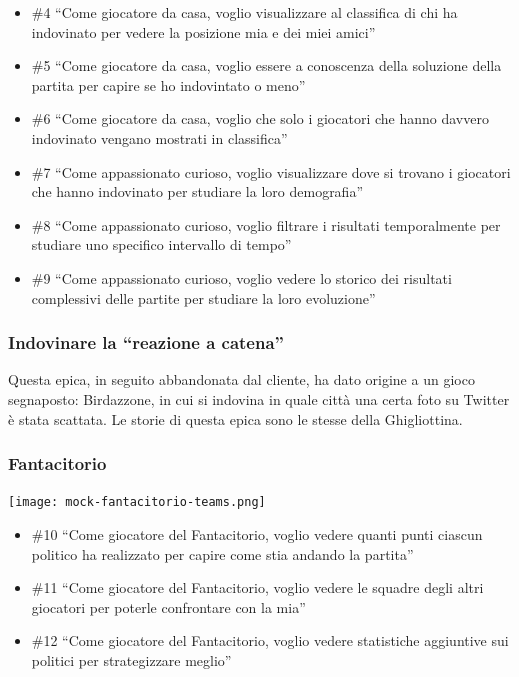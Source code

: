 \documentclass{article}
\begin{document}
\begin{itemize}
	\item \#4 ``Come giocatore da casa, voglio visualizzare al classifica di chi ha
	      indovinato per vedere la posizione mia e dei miei amici''
	\item \#5 ``Come giocatore da casa, voglio essere a conoscenza della soluzione
	      della partita per capire se ho indovintato o meno''
	\item \#6 ``Come giocatore da casa, voglio che solo i giocatori che hanno davvero
	      indovinato vengano mostrati in classifica''
	\item \#7 ``Come appassionato curioso, voglio visualizzare dove si trovano i
	      giocatori che hanno indovinato per studiare la loro demografia''
	\item \#8 ``Come appassionato curioso, voglio filtrare i risultati temporalmente
	      per studiare uno specifico intervallo di tempo''
	\item \#9 ``Come appassionato curioso, voglio vedere lo storico dei risultati
	      complessivi delle partite per studiare la loro evoluzione''
\end{itemize}

\subsubsection{Indovinare la ``reazione a catena''}

Questa epica, in seguito abbandonata dal cliente, ha dato origine a un gioco
segnaposto: Birdazzone, in cui si indovina in quale città una certa foto su
Twitter è stata scattata. Le storie di questa epica sono le stesse della
Ghigliottina.

\subsubsection{Fantacitorio}

\texttt{[image: mock-fantacitorio-teams.png]}

\begin{itemize}
	\item \#10 ``Come giocatore del Fantacitorio, voglio vedere quanti punti ciascun
	      politico ha realizzato per capire come stia andando la partita''
	\item \#11 ``Come giocatore del Fantacitorio, voglio vedere le squadre degli altri
	      giocatori per poterle confrontare con la mia''
	\item \#12 ``Come giocatore del Fantacitorio, voglio vedere statistiche aggiuntive
	      sui politici per strategizzare meglio''
\end{itemize}
\end{document}
